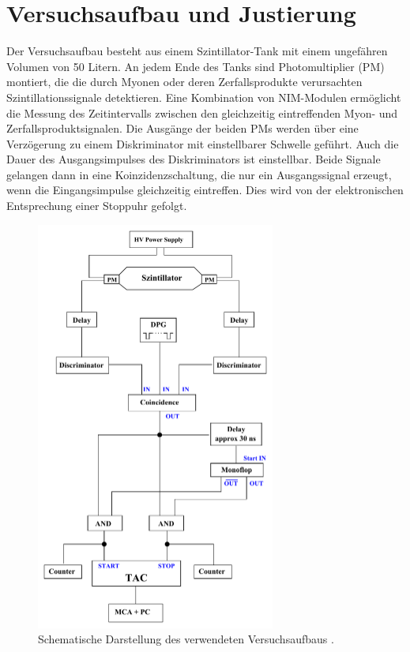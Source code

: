 \section{Versuchsaufbau und Justierung}

Der Versuchsaufbau besteht aus einem Szintillator-Tank mit einem ungefähren Volumen von 50 Litern. An jedem Ende des Tanks sind Photomultiplier (PM) montiert, die die durch Myonen oder deren Zerfallsprodukte verursachten Szintillationssignale detektieren. Eine Kombination von NIM-Modulen ermöglicht die Messung des Zeitintervalls zwischen den gleichzeitig eintreffenden Myon- und Zerfallsproduktsignalen. Die Ausgänge der beiden PMs werden über eine Verzögerung zu einem Diskriminator mit einstellbarer Schwelle geführt. Auch die Dauer des Ausgangsimpulses des Diskriminators ist einstellbar. Beide Signale gelangen dann in eine Koinzidenzschaltung, die nur ein Ausgangssignal erzeugt, wenn die Eingangsimpulse gleichzeitig eintreffen. Dies wird von der elektronischen Entsprechung einer Stoppuhr gefolgt.

\begin{figure}
	\centering
	\includegraphics[width=0.7\textwidth]{content/grafik/Aufbau.pdf}
	\caption{Schematische Darstellung des verwendeten Versuchsaufbaus \cite{myon}.}
	\label{fig:Aufbau}
\end{figure}


